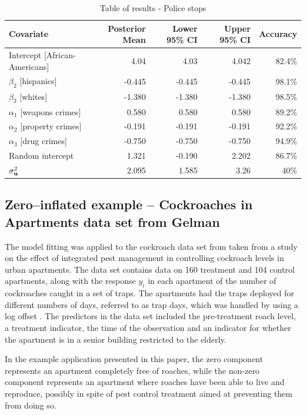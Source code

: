 \documentclass{amsart}[12pt]
\begin{document}
	\begin{table}
		\caption{Table of results - Police stops}
		\label{tab:application_police_stops}
		\begin{tabular}{|l|rrrr|}
			\hline
			Covariate          & Posterior Mean & Lower 95\% CI & Upper 95\% CI & Accuracy \\
			\hline
			Intercept [African-Americans] & 4.04 & 4.03 & 4.042 & 82.4\% \\
			$\beta_2$ [hispanics] & -0.445 & -0.445 & -0.445 & 98.1\% \\
			$\beta_3$ [whites] & -1.380 & -1.380 & -1.380 & 98.5\% \\
			$\alpha_1$ [weapons crimes] & 0.580 & 0.580 & 0.580 & 89.2\%     \\
			$\alpha_2$ [property crimes] & -0.191 & -0.191 & -0.191 & 92.2\%     \\
			$\alpha_3$ [drug crimes] & -0.750 & -0.750 & -0.750 & 94.9\%     \\
			Random intercept & 1.321 & -0.190 & 2.202 & 86.7\% \\
			$\sigma^2_{{\bf u}}$ & 2.095 & 1.585 & 3.26 & 40\% \\
			\hline
		\end{tabular}
	\end{table}



	\subsection{Zero--inflated example -- Cockroaches in Apartments data set from Gelman}
	The model fitting was applied to the cockroach data set from \citep{Gelman2007} taken from a study on the
	effect of integrated pest management in controlling cockroach levels in urban apartments. The data set
	contains data on 160 treatment and 104 control apartments, along with the response $y_i$ in each apartment of
	the number of cockroaches caught in a set of traps. The apartments had the traps deployed for different
	numbers of days, referred to as trap days, which was handled by using a log offset \citep{Agresti2002}. The
	predictors in the data set included the pre-treatment roach level, a treatment indicator, the time of the
	observation and an indicator for whether the apartment is in a senior building restricted to the elderly.
		
	In the example application presented in this paper, the zero component represents an apartment completely free of roaches, while the non-zero component represents an apartment where roaches have been able to live and reproduce, possibly in spite of pest control treatment aimed at preventing them from doing so.
		
\end{document}
